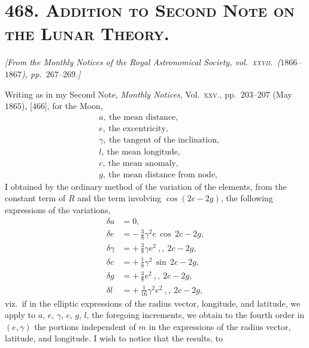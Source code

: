 \documentclass[11pt]{article}
\begin{document}
\section*{468. \textsc{Addition to Second Note on the Lunar Theory.}}

\begin{center}
\textit{[From the Monthly Notices of the Royal Astronomical Society,
vol.\ \textsc{xxvii}.\ ($1866$--$1867$), pp.\ $267$--$269$.]}
\end{center}

\medskip

Writing as in my Second Note, \textit{Monthly Notices}, Vol.\ \textsc{xxv}.,
pp.\ $203$--$207$ (May $1865$), [466], for the Moon,
\begin{align*}
&a,\ \text{the mean distance,}\\
&e,\ \text{the excentricity,}\\
&\gamma,\ \text{the tangent of the inclination,}\\
&l,\ \text{the mean longitude,}\\
&c,\ \text{the mean anomaly,}\\
&g,\ \text{the mean distance from node,}
\end{align*}
I obtained by the ordinary method of the variation of the elements,
from the constant term of $R$ and the term involving $\cos(2c - 2g)$,
the following expressions of the variations,
\begin{align*}
\delta a &= 0, \\
\delta e &= -\,\tfrac{3}{8}\gamma^{2}e\,\cos\,2c - 2g, \\
\delta \gamma &= +\,\tfrac{3}{8}\gamma e^{2}\ ,, \ 2c - 2g, \\
\delta c &= +\,\tfrac{1}{8}\gamma^{2}\,\sin\,2c - 2g, \\
\delta g &= +\,\tfrac{3}{8}e^{2}\ ,, \ 2c - 2g, \\
\delta l &= +\,\tfrac{1}{16}\gamma^{2}e^{2}\ ,, \ 2c - 2g,
\end{align*}
viz.\ if in the elliptic expressions of the radius vector, longitude,
and latitude, we apply to $a$, $e$, $\gamma$, $c$, $g$, $l$, the
foregoing increments, we obtain to the fourth order in $(e,\gamma)$
the portions independent of $m$ in the expressions of the radius
vector, latitude, and longitude. I wish to notice that the results, to
\end{document}
